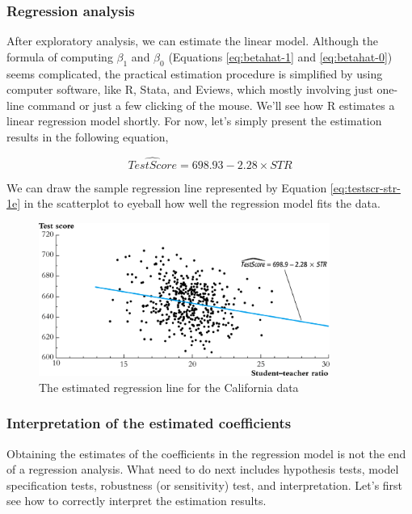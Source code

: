 \documentclass[a4paper,11pt]{article}
\begin{document}
\subsubsection*{Regression analysis}
\label{sec:orgbca3784}
After exploratory analysis, we can estimate the linear model. Although
the formula of computing \(\beta_{\text{1}}\) and \(\beta_{\text{0}}\) (Equations
\ref{eq:betahat-1} and \ref{eq:betahat-0}) seems complicated, the
practical estimation procedure is simplified by using computer software,
like R, Stata, and Eviews, which mostly involving just one-line
command or just a few clicking of the mouse. We'll see how R estimates
a linear regression model shortly. For now, let's simply present the
estimation results in the following equation,

\begin{equation}
\label{eq:testscr-str-1e}
\widehat{TestScore} = 698.93 - 2.28 \times STR
\end{equation}

We can draw the sample regression line represented by Equation
\ref{eq:testscr-str-1e} in the scatterplot to eyeball how well the
regression model fits the data.

\begin{figure}[htbp]
\centering
\includegraphics[width=0.85\textwidth]{img/fig-4-3.png}
\caption{The estimated regression line for the California data}
\end{figure}

\subsubsection*{Interpretation of the estimated coefficients}
\label{sec:org1843a1a}

Obtaining the estimates of the coefficients in the regression model is
not the end of a regression analysis. What need to do next includes
hypothesis tests, model specification tests, robustness (or
sensitivity) test, and interpretation. Let's first see how to
correctly interpret the estimation results.
\end{document}
